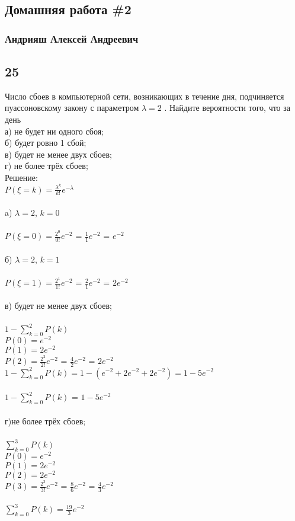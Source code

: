 \documentclass[a4paper, 12pt]{extarticle}
\numberwithin{figure}{section}
\begin{document}
\subsection*{Домашняя работа \#2}

\subsubsection*{Андрияш Алексей Андреевич}

\subsection*{25}
Число сбоев в компьютерной сети, возникающих в течение дня, подчиняется
пуассоновскому закону с параметром $\lambda = 2$ . Найдите вероятности того, что за день\\
а) не будет ни одного сбоя;\\
б) будет ровно 1 сбой;\\
в) будет не менее двух сбоев;\\
г) не более трёх сбоев;\\

Решение:\\

$P(\xi=k)=\frac{\lambda^k}{k!}e^{-\lambda}$\\
\\
a) $\lambda=2$, $k=0$\\
\\
$P(\xi=0)=\frac{2^0}{0!}e^{-2}$ = $\frac{1}{1}e^{-2}$ = $e^{-2}$\\
\\
б) $\lambda=2$, $k=1$\\
\\
$P(\xi=1)=\frac{2^1}{1!}e^{-2}$ = $\frac{2}{1}e^{-2}$ = $2e^{-2}$\\
\\
в) будет не менее двух сбоев;\\
\\
$1-\sum_{k=0}^{2}P(k)$
\\
$P(0)= e^{-2}$\\
$P(1)= 2e^{-2}$\\
$P(2)=\frac{2^2}{2!}e^{-2}$ = $\frac{4}{2}e^{-2}$ = $2e^{-2}$\\
$1-\sum_{k=0}^{2}P(k) = 1-(e^{-2} + 2e^{-2} + 2e^{-2}) = 1 - 5e^{-2}$\\
\\
$1-\sum_{k=0}^{2}P(k)$ = $1 - 5e^{-2}$\\
\\
г)не более трёх сбоев;\\
\\
$\sum_{k=0}^{3}P(k)$
\\
$P(0)= e^{-2}$\\
$P(1)= 2e^{-2}$\\
$P(2)= 2e^{-2}$\\
$P(3)=\frac{2^3}{3!}e^{-2}$ = $\frac{8}{6}e^{-2}$ = $\frac{4}{3}e^{-2}$\\
\\
$\sum_{k=0}^{3}P(k) = \frac{19}{3}e^{-2}$
\\
\end{document}
